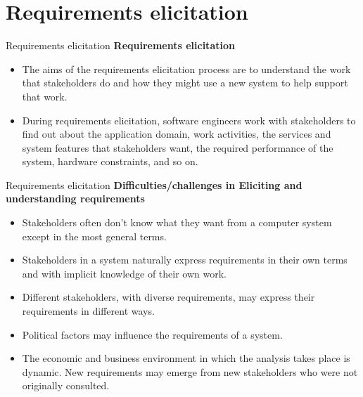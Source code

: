 \documentclass{beamer}
\begin{document}
\section{Requirements elicitation}
\begin{frame}{Requirements elicitation}
	\textbf{Requirements elicitation}
	\begin{itemize}
		\item The aims of the requirements elicitation process are to understand the work that stakeholders   do and how they might use a new system to help support that work.
		\item During requirements elicitation, software engineers work with stakeholders to find out about    the application domain, work activities, the services and system features that stakeholders want, the required performance of the system, hardware constraints, and so on.
		
	\end{itemize}
\end{frame}
\begin{frame}{Requirements elicitation}
	\textbf{Difficulties/challenges in Eliciting and understanding requirements}
	\begin{itemize}
		\item Stakeholders often don’t know what they want from a computer system 
		except in the most general terms.
		\item Stakeholders in a system naturally express requirements in their own terms 
		and with implicit knowledge of their own work.
		\item Different stakeholders, with diverse requirements, may express their 
		requirements in different ways.
		\item Political factors may influence the requirements of a system. 
		\item The economic and business environment in which the analysis takes place 
		is dynamic. New requirements may emerge from new stakeholders who 
		were not originally consulted.
	\end{itemize}
\end{frame}
\end{document}
